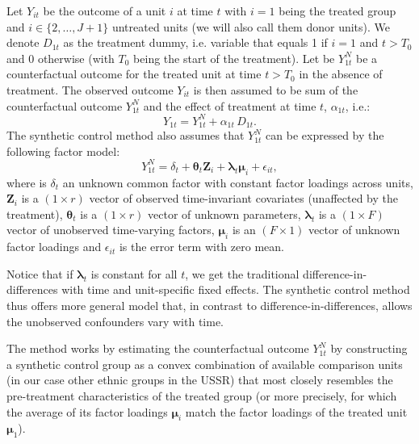 Let $Y_{it}$ be the outcome of a unit $i$ at time $t$ with $i = 1$ being the treated group and $i \in \{ 2, \dots, J + 1 \}$ untreated units (we will also call them donor units).  We
denote $D_{1t}$ as the treatment dummy, i.e. variable that equals 1 if $i = 1$ and $t > T_0$ and 0 otherwise (with $T_0$ being the start of the treatment). 
Let be $Y_{1t}^N$ be a counterfactual outcome for the treated unit at time $t > T_0$ in the absence of treatment. 
The observed outcome $Y_{it}$ is then assumed to be  sum of the counterfactual outcome $Y_{1t}^N$ and the effect of treatment at time $t$, $\alpha_{1t}$, i.e.:
\begin{equation}
    Y_{1t} = Y_{1t}^N + \alpha_{1t} \, D_{1t}.
\end{equation}
The synthetic control method also assumes that $Y_{1t}^N$  can be expressed by the following factor model:
\begin{equation} \label{factor_model}
   Y_{1t}^N = \delta_t + \boldsymbol{\theta}_t \boldsymbol{Z}_i +
   \boldsymbol{\lambda}_t \boldsymbol{\mu}_i + \epsilon_{it},
\end{equation}
where is $\delta_t$ an unknown common factor with constant factor
loadings across units, $\boldsymbol{Z}_i$ is a
$(1 \times r)$ vector of observed time-invariant covariates (unaffected by the treatment),  $\boldsymbol{\theta}_t$ is a $(1 \times r)$ vector of
unknown parameters, $\boldsymbol{\lambda}_t$ is a $(1 \times F)$ vector of unobserved time-varying factors, $\boldsymbol{\mu}_i$ is an $(F \times 1)$ vector of unknown factor loadings
and $\epsilon_{it}$ is the error term with zero mean.

Notice that if $\boldsymbol{\lambda}_t$ is constant  for all $t$, we get the traditional
difference-in-differences with time and unit-specific fixed effects. 
The synthetic control method thus offers more general model that, in contrast to difference-in-differences, allows the unobserved confounders vary with time.


The method works by estimating the counterfactual outcome $Y_{1t}^N$  by constructing a synthetic control group  as a convex combination of available comparison units (in our case other ethnic groups in the USSR) that most closely resembles the pre-treatment characteristics of the treated group
 (or more precisely, for which the average of its factor loadings $\boldsymbol{\mu}_i$ match the factor loadings of the treated unit  $\boldsymbol{\mu}_1$). 
 
